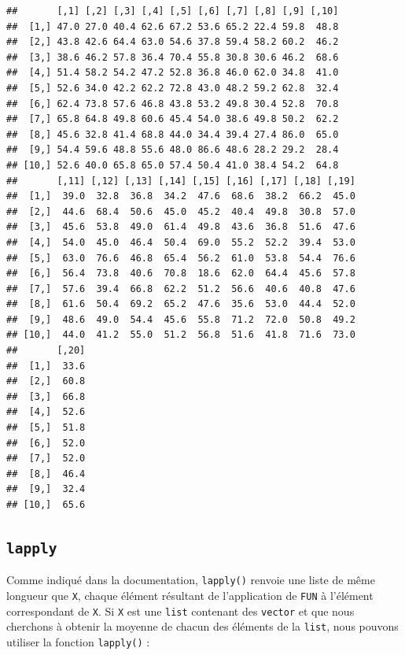 \documentclass[twoside,symmetric]{book}
\begin{document}
\begin{verbatim}
##       [,1] [,2] [,3] [,4] [,5] [,6] [,7] [,8] [,9] [,10]
##  [1,] 47.0 27.0 40.4 62.6 67.2 53.6 65.2 22.4 59.8  48.8
##  [2,] 43.8 42.6 64.4 63.0 54.6 37.8 59.4 58.2 60.2  46.2
##  [3,] 38.6 46.2 57.8 36.4 70.4 55.8 30.8 30.6 46.2  68.6
##  [4,] 51.4 58.2 54.2 47.2 52.8 36.8 46.0 62.0 34.8  41.0
##  [5,] 52.6 34.0 42.2 62.2 72.8 43.0 48.2 59.2 62.8  32.4
##  [6,] 62.4 73.8 57.6 46.8 43.8 53.2 49.8 30.4 52.8  70.8
##  [7,] 65.8 64.8 49.8 60.6 45.4 54.0 38.6 49.8 50.2  62.2
##  [8,] 45.6 32.8 41.4 68.8 44.0 34.4 39.4 27.4 86.0  65.0
##  [9,] 54.4 59.6 48.8 55.6 48.0 86.6 48.6 28.2 29.2  28.4
## [10,] 52.6 40.0 65.8 65.0 57.4 50.4 41.0 38.4 54.2  64.8
##       [,11] [,12] [,13] [,14] [,15] [,16] [,17] [,18] [,19]
##  [1,]  39.0  32.8  36.8  34.2  47.6  68.6  38.2  66.2  45.0
##  [2,]  44.6  68.4  50.6  45.0  45.2  40.4  49.8  30.8  57.0
##  [3,]  45.6  53.8  49.0  61.4  49.8  43.6  36.8  51.6  47.6
##  [4,]  54.0  45.0  46.4  50.4  69.0  55.2  52.2  39.4  53.0
##  [5,]  63.0  76.6  46.8  65.4  56.2  61.0  53.8  54.4  76.6
##  [6,]  56.4  73.8  40.6  70.8  18.6  62.0  64.4  45.6  57.8
##  [7,]  57.6  39.4  66.8  62.2  51.2  56.6  40.6  40.8  47.6
##  [8,]  61.6  50.4  69.2  65.2  47.6  35.6  53.0  44.4  52.0
##  [9,]  48.6  49.0  54.4  45.6  55.8  71.2  72.0  50.8  49.2
## [10,]  44.0  41.2  55.0  51.2  56.8  51.6  41.8  71.6  73.0
##       [,20]
##  [1,]  33.6
##  [2,]  60.8
##  [3,]  66.8
##  [4,]  52.6
##  [5,]  51.8
##  [6,]  52.0
##  [7,]  52.0
##  [8,]  46.4
##  [9,]  32.4
## [10,]  65.6
\end{verbatim}

\hypertarget{l17sapply}{%
\subsection{\texorpdfstring{\texttt{lapply}}{lapply}}\label{l17sapply}}

Comme indiqué dans la documentation, \texttt{lapply()} renvoie une liste de même longueur que \texttt{X}, chaque élément résultant de l'application de \texttt{FUN} à l'élément correspondant de \texttt{X}. Si \texttt{X} est une \texttt{list} contenant des \texttt{vector} et que nous cherchons à obtenir la moyenne de chacun des éléments de la \texttt{list}, nous pouvons utiliser la fonction \texttt{lapply()} :
\end{document}
